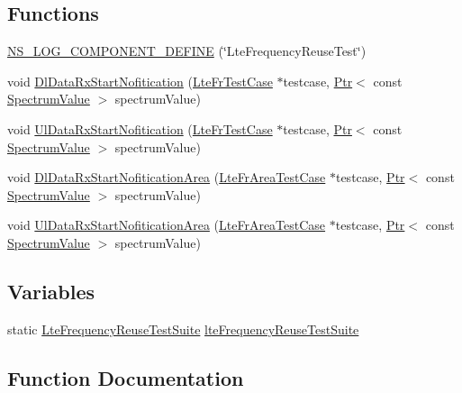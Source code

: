 \subsection*{Functions}
\begin{DoxyCompactItemize}
\item 
\hyperlink{lte-test-frequency-reuse_8cc_a8db86ce663d0c8cacf9ef2ca1c0ab84e}{N\+S\+\_\+\+L\+O\+G\+\_\+\+C\+O\+M\+P\+O\+N\+E\+N\+T\+\_\+\+D\+E\+F\+I\+NE} (\char`\"{}Lte\+Frequency\+Reuse\+Test\char`\"{})
\item 
void \hyperlink{lte-test-frequency-reuse_8cc_aaf568764de648457da3536a8940a8510}{Dl\+Data\+Rx\+Start\+Nofitication} (\hyperlink{classLteFrTestCase}{Lte\+Fr\+Test\+Case} $\ast$testcase, \hyperlink{classns3_1_1Ptr}{Ptr}$<$ const \hyperlink{classns3_1_1SpectrumValue}{Spectrum\+Value} $>$ spectrum\+Value)
\item 
void \hyperlink{lte-test-frequency-reuse_8cc_ae8691768e5cb30db2389ac11752ce7b3}{Ul\+Data\+Rx\+Start\+Nofitication} (\hyperlink{classLteFrTestCase}{Lte\+Fr\+Test\+Case} $\ast$testcase, \hyperlink{classns3_1_1Ptr}{Ptr}$<$ const \hyperlink{classns3_1_1SpectrumValue}{Spectrum\+Value} $>$ spectrum\+Value)
\item 
void \hyperlink{lte-test-frequency-reuse_8cc_a39fd51e5983e3a2105d2862729ad91e0}{Dl\+Data\+Rx\+Start\+Nofitication\+Area} (\hyperlink{classLteFrAreaTestCase}{Lte\+Fr\+Area\+Test\+Case} $\ast$testcase, \hyperlink{classns3_1_1Ptr}{Ptr}$<$ const \hyperlink{classns3_1_1SpectrumValue}{Spectrum\+Value} $>$ spectrum\+Value)
\item 
void \hyperlink{lte-test-frequency-reuse_8cc_a1011b9d239710e3f627e9aada5d64778}{Ul\+Data\+Rx\+Start\+Nofitication\+Area} (\hyperlink{classLteFrAreaTestCase}{Lte\+Fr\+Area\+Test\+Case} $\ast$testcase, \hyperlink{classns3_1_1Ptr}{Ptr}$<$ const \hyperlink{classns3_1_1SpectrumValue}{Spectrum\+Value} $>$ spectrum\+Value)
\end{DoxyCompactItemize}
\subsection*{Variables}
\begin{DoxyCompactItemize}
\item 
static \hyperlink{classLteFrequencyReuseTestSuite}{Lte\+Frequency\+Reuse\+Test\+Suite} \hyperlink{lte-test-frequency-reuse_8cc_a8d0ab0da7925ec7195a0bbd36bc608f1}{lte\+Frequency\+Reuse\+Test\+Suite}
\end{DoxyCompactItemize}


\subsection{Function Documentation}
